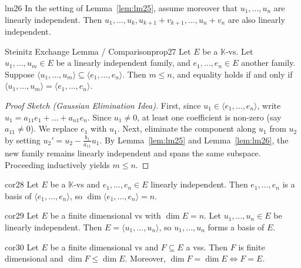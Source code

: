\documentclass[11pt, a4paper]{article}
\newcommand{\K}{\mathbb{K}}
\begin{document}
\begin{lemma}{}{lm26}
  In the setting of Lemma~\ref{lem:lm25}, assume moreover that $u_1, \dots, u_n$ are linearly independent. Then $u_1, \dots, u_k, u_{k+1} + v_{k+1}, \dots, u_n + v_n$ are also linearly independent.
\end{lemma}

\begin{proposition}{Steinitz Exchange Lemma / Comparison}{prop27}
  Let $E$ be a $\K$-vs. Let $u_1, \dots, u_m \in E$ be a linearly independent family, and $e_1, \dots, e_n \in E$ another family. Suppose $\langle u_1, \dots, u_m \rangle \subseteq \langle e_1, \dots, e_n \rangle$. Then $m \le n$, and equality holds if and only if $\langle u_1, \dots, u_m \rangle = \langle e_1, \dots, e_n \rangle$.
\end{proposition}

\begin{proof}[Proof Sketch (Gaussian Elimination Idea)]
  First, since $u_1 \in \langle e_1, \dots, e_n \rangle$, write $u_1 = a_{11}e_1 + \dots + a_{n1}e_n$. Since $u_1 \neq 0$, at least one coefficient is non-zero (say $a_{11} \neq 0$). We replace $e_1$ with $u_1$.
  Next, eliminate the component along $u_1$ from $u_2$ by setting $u_2' = u_2 - \frac{b_1}{a_{11}} u_1$. By Lemma~\ref{lem:lm25} and Lemma~\ref{lem:lm26}, the new family remains linearly independent and spans the same subspace. Proceeding inductively yields $m \le n$.
\end{proof}

\begin{corollary}{}{cor28}
  Let $E$ be a $\K$-vs and $e_1, \dots, e_n \in E$ linearly independent. Then $e_1, \dots, e_n$ is a basis of $\langle e_1, \dots, e_n \rangle$, so $\dim \langle e_1, \dots, e_n \rangle = n$.
\end{corollary}

\begin{corollary}{}{cor29}
  Let $E$ be a finite dimensional vs with $\dim E = n$. Let $u_1, \dots, u_n \in E$ be linearly independent. Then $E = \langle u_1, \dots, u_n \rangle$, so $u_1, \dots, u_n$ forms a basis of $E$.
\end{corollary}

\begin{corollary}{}{cor30}
  Let $E$ be a finite dimensional vs and $F \subseteq E$ a vss. Then $F$ is finite dimensional and $\dim F \le \dim E$. Moreover, $\dim F = \dim E \iff F = E$.
\end{corollary}
\end{document}
